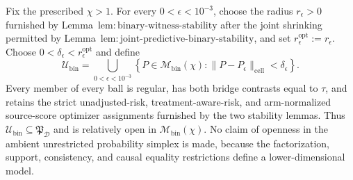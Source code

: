 Fix the prescribed \(\chi>1\). For every \(0<\epsilon<10^{-3}\), choose the radius \(r_\epsilon>0\) furnished by Lemma~\(\mathrm{lem{:}binary\text{-}witness\text{-}stability}\) after the joint shrinking permitted by Lemma~\(\mathrm{lem{:}joint\text{-}predictive\text{-}binary\text{-}stability}\), and set \(r_\epsilon^{\mathrm{opt}}:=r_\epsilon\). Choose \(0<\delta_\epsilon<r_\epsilon^{\mathrm{opt}}\) and define
\[
 \mathcal U_{\mathrm{bin}}
 =\bigcup_{0<\epsilon<10^{-3}}
 \left\{P\in\mathcal M_{\mathrm{bin}}(\chi):
 \|P-P_\epsilon\|_{\mathrm{cell}}<\delta_\epsilon\right\}. \tag{1}
\]
Every member of every ball is regular, has both bridge contrasts equal to \(\tau\), and retains the strict unadjusted-risk, treatment-aware-risk, and arm-normalized source-score optimizer assignments furnished by the two stability lemmas. Thus \(\mathcal U_{\mathrm{bin}}\subseteq\mathfrak P_{\mathcal D}\) and is relatively open in \(\mathcal M_{\mathrm{bin}}(\chi)\). No claim of openness in the ambient unrestricted probability simplex is made, because the factorization, support, consistency, and causal equality restrictions define a lower-dimensional model.